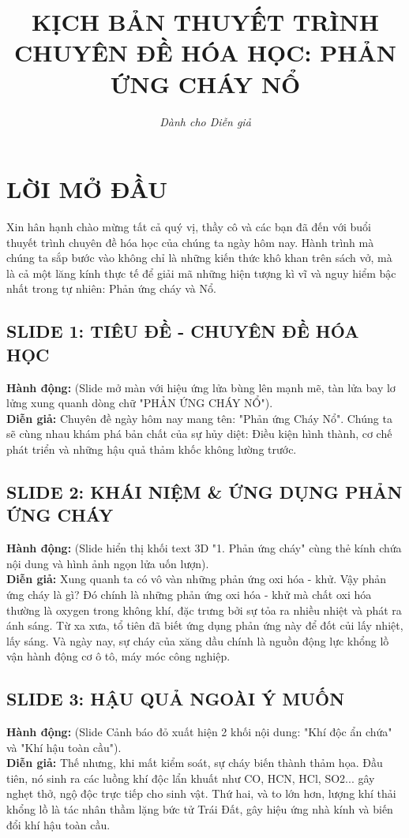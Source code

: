 \documentclass[13pt,a4paper]{article}
\title{\textbf{KỊCH BẢN THUYẾT TRÌNH\\CHUYÊN ĐỀ HÓA HỌC: PHẢN ỨNG CHÁY NỔ}}
\author{\textit{Dành cho Diễn giả}}
\date{}
\begin{document}
\maketitle

\section*{LỜI MỞ ĐẦU}
Xin hân hạnh chào mừng tất cả quý vị, thầy cô và các bạn đã đến với buổi thuyết trình chuyên đề hóa học của chúng ta ngày hôm nay. Hành trình mà chúng ta sắp bước vào không chỉ là những kiến thức khô khan trên sách vở, mà là cả một lăng kính thực tế để giải mã những hiện tượng kì vĩ và nguy hiểm bậc nhất trong tự nhiên: Phản ứng cháy và Nổ.

\hrulefill

\subsection*{SLIDE 1: TIÊU ĐỀ - CHUYÊN ĐỀ HÓA HỌC}
\textbf{Hành động:} (Slide mở màn với hiệu ứng lửa bùng lên mạnh mẽ, tàn lửa bay lơ lửng xung quanh dòng chữ "PHẢN ỨNG CHÁY NỔ").\\
\textbf{Diễn giả:} Chuyên đề ngày hôm nay mang tên: "Phản ứng Cháy Nổ". Chúng ta sẽ cùng nhau khám phá bản chất của sự hủy diệt: Điều kiện hình thành, cơ chế phát triển và những hậu quả thảm khốc không lường trước.

\subsection*{SLIDE 2: KHÁI NIỆM \& ỨNG DỤNG PHẢN ỨNG CHÁY}
\textbf{Hành động:} (Slide hiển thị khối text 3D "1. Phản ứng cháy" cùng thẻ kính chứa nội dung và hình ảnh ngọn lửa uốn lượn).\\
\textbf{Diễn giả:} Xung quanh ta có vô vàn những phản ứng oxi hóa - khử. Vậy phản ứng cháy là gì? Đó chính là những phản ứng oxi hóa - khử mà chất oxi hóa thường là oxygen trong không khí, đặc trưng bởi sự tỏa ra nhiều nhiệt và phát ra ánh sáng. 
Từ xa xưa, tổ tiên đã biết ứng dụng phản ứng này để đốt củi lấy nhiệt, lấy sáng. Và ngày nay, sự cháy của xăng dầu chính là nguồn động lực khổng lồ vận hành động cơ ô tô, máy móc công nghiệp.

\subsection*{SLIDE 3: HẬU QUẢ NGOÀI Ý MUỐN}
\textbf{Hành động:} (Slide Cảnh báo đỏ xuất hiện 2 khối nội dung: "Khí độc ẩn chứa" và "Khí hậu toàn cầu").\\
\textbf{Diễn giả:} Thế nhưng, khi mất kiểm soát, sự cháy biến thành thảm họa. Đầu tiên, nó sinh ra các luồng khí độc lẩn khuất như CO, HCN, HCl, SO2... gây nghẹt thở, ngộ độc trực tiếp cho sinh vật. Thứ hai, và to lớn hơn, lượng khí thải khổng lồ là tác nhân thầm lặng bức tử Trái Đất, gây hiệu ứng nhà kính và biến đổi khí hậu toàn cầu.
\end{document}
